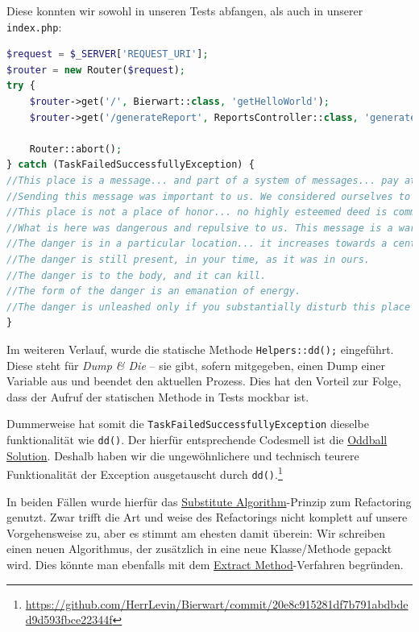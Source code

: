 \documentclass[12pt,a4paper,titlepage,ngerman,pdftex]{report}
\begin{document}
    Diese konnten wir sowohl in unseren Tests abfangen, als auch in unserer \verb|index.php|:

    \begin{lstlisting}[language=php,label={lst:lstlisting},caption={Ursprüngliche Implementation der Router-Exception}]
$request = $_SERVER['REQUEST_URI'];
$router = new Router($request);
try {
    $router->get('/', Bierwart::class, 'getHelloWorld');
    $router->get('/generateReport', ReportsController::class, 'generateReport');

    Router::abort();
} catch (TaskFailedSuccessfullyException) {
//This place is a message... and part of a system of messages... pay attention to it!
//Sending this message was important to us. We considered ourselves to be a powerful culture.
//This place is not a place of honor... no highly esteemed deed is commemorated here... nothing valued is here.
//What is here was dangerous and repulsive to us. This message is a warning about danger.
//The danger is in a particular location... it increases towards a center... the center of danger is here... of a particular size and shape, and below us.
//The danger is still present, in your time, as it was in ours.
//The danger is to the body, and it can kill.
//The form of the danger is an emanation of energy.
//The danger is unleashed only if you substantially disturb this place physically. This place is best shunned and left uninhabited.
}
    \end{lstlisting}
\noindent
    Im weiteren Verlauf, wurde die statische Methode \verb|Helpers::dd();| eingeführt.
    Diese steht für \textit{Dump \& Die} -- sie gibt, sofern mitgegeben, einen Dump einer Variable aus und beendet den aktuellen Prozess.
    Dies hat den Vorteil zur Folge, dass der Aufruf der statischen Methode in Tests mockbar ist.

    Dummerweise hat somit die \verb|TaskFailedSuccessfullyException| dieselbe funktionalität wie \verb|dd()|.
    Der hierfür entsprechende Codesmell ist die \href{https://pragmaticways.com/31-code-smells-you-must-know/#6_Oddball_Solution}{Oddball Solution}.
    Deshalb haben wir die ungewöhnlichere und technisch teurere Funktionalität der Exception ausgetauscht durch \verb|dd()|.\footnote{\url{https://github.com/HerrLevin/Bierwart/commit/20e8c915281df7b791abdbded9d593fbce22344f}}

    In beiden Fällen wurde hierfür das \href{https://refactoring.guru/substitute-algorithm}{Substitute Algorithm}-Prinzip zum Refactoring genutzt.
    Zwar trifft die Art und weise des Refactorings nicht komplett auf unsere Vorgehensweise zu, aber es stimmt am ehesten damit überein:
    Wir schreiben einen neuen \glqq Algorithmus\grqq{}, der zusätzlich in eine neue Klasse/Methode gepackt wird.
    Dies könnte man ebenfalls mit dem \href{https://refactoring.guru/extract-method}{Extract Method}-Verfahren begründen.
\end{document}
